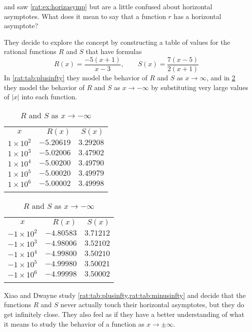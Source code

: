 \begin{pccexample}
	 and  saw \cref{rat:ex:horizasymp} but are a little confused
	about horizontal asymptotes. What does it mean to say that a function $r$ has a horizontal
	asymptote?

	They decide to explore the concept by
	constructing a table of values for the rational functions $R$ and  $S$ that have formulas
	\[
		R(x)=\frac{-5(x+1)}{x-3}, \qquad S(x)=\frac{7(x-5)}{2(x+1)}
	\]
	In \cref{rat:tab:plusinfty} they model the behavior of $R$ and $S$ as $x\rightarrow\infty$,
	and in \cref{rat:tab:minusinfty} they model the behavior of $R$ and $S$ as $x\rightarrow-\infty$
	by substituting very large values of $|x|$ into each function.
	\begin{table}[!htb]
		\begin{minipage}{.5\textwidth}
			\centering
			\caption{$R$ and $S$ as $x\rightarrow\infty$}
			\label{rat:tab:plusinfty}
			\begin{tabular}{crr}
				\beforeheading
				$x$            & $R(x)$     & $S(x)$    \\ \afterheading
				$1\times 10^2$ & $-5.20619$ & $3.29208$ \\\normalline
				$1\times 10^3$ & $-5.02006$ & $3.47902$ \\\normalline
				$1\times 10^4$ & $-5.00200$ & $3.49790$ \\\normalline
				$1\times 10^5$ & $-5.00020$ & $3.49979$ \\\normalline
				$1\times 10^6$ & $-5.00002$ & $3.49998$ \\\lastline
			\end{tabular}
		\end{minipage}%
		\begin{minipage}{.5\textwidth}
			\centering
			\caption{$R$ and $S$ as $x\rightarrow-\infty$}
			\label{rat:tab:minusinfty}
			\begin{tabular}{crr}
				\beforeheading
				$x$             & $R(x)$     & $S(x)$    \\ \afterheading
				$-1\times 10^2$ & $-4.80583$ & $3.71212$ \\\normalline
				$-1\times 10^3$ & $-4.98006$ & $3.52102$ \\\normalline
				$-1\times 10^4$ & $-4.99800$ & $3.50210$ \\\normalline
				$-1\times 10^5$ & $-4.99980$ & $3.50021$ \\\normalline
				$-1\times 10^6$ & $-4.99998$ & $3.50002$ \\\lastline
			\end{tabular}
		\end{minipage}
	\end{table}

	Xiao and Dwayne study \cref{rat:tab:plusinfty,rat:tab:minusinfty} and decide that
	the functions $R$ and $S$ never actually touch their horizontal asymptotes, but they
	do get infinitely close. They also feel as if they have a better understanding of
	what it means to study the behavior of a function as $x\rightarrow\pm\infty$.
\end{pccexample}


